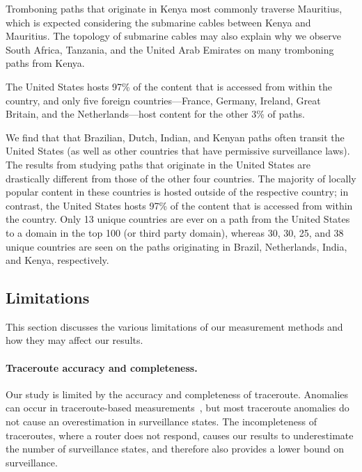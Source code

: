 Tromboning paths that originate in Kenya most commonly traverse Mauritius,
which is expected considering the submarine cables between Kenya and
Mauritius.  The topology of submarine cables may also explain why we observe
South Africa, Tanzania, and the United Arab Emirates on many tromboning paths
from Kenya.


\begin{finding}
The United States hosts 97\% of the content that is accessed from within the country, and only five foreign countries---France, Germany, Ireland, Great Britain, and the Netherlands---host content for the other 3\% of paths.
\end{finding}
\noindent

We find that that Brazilian, Dutch, Indian, and Kenyan paths
often transit the United States (as well as other countries that have permissive
surveillance laws). The results from
studying paths that originate in the United States are drastically different from
those
of the other four countries.  The majority of locally popular content in these countries
is hosted outside of the respective country; in contrast, the United States hosts
97\% of the
content that is accessed from within the country.  Only 13 unique countries
are ever on a path from the United States to a domain in the top 100 (or third party
domain), whereas 30, 30, 25, and 38 unique countries are seen on the paths
originating in Brazil, Netherlands, India, and Kenya, respectively.


\subsection{Limitations}

This section discusses the various limitations of our measurement methods
and how they may affect our results.

\paragraph{Traceroute accuracy and completeness.}
Our study is limited by the accuracy and completeness of traceroute.
Anomalies can occur in traceroute-based
measurements~\cite{augustin2006avoiding}, but most traceroute anomalies
do not cause an overestimation in surveillance states.  The
incompleteness of traceroutes, where a router does not respond, causes
our results to underestimate the number of surveillance states, and
therefore also provides a lower bound on surveillance. 


